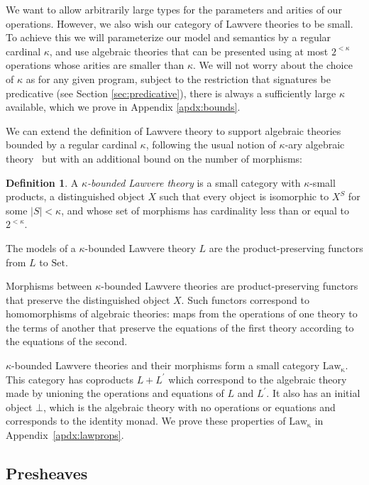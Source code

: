 \documentclass[acmsmall, screen, review, anonymous]{acmart}
\theoremstyle{definition}
\newtheorem{definition}{Definition}[section]
\newcommand{\setc}{\mathrm{Set}}
\newcommand{\initial}{\bot}
\newcommand{\lawc}{\mathrm{Law_{\kappa}}}
\begin{document}
We want to allow arbitrarily large types for the parameters and arities
of our operations. However, we also wish our category of Lawvere
theories to be small. To achieve this we will parameterize our model and
semantics by a regular cardinal $\kappa$, and use algebraic theories
that can be presented using at most $2^{<\kappa}$ operations whose
arities are smaller than $\kappa$. We will not worry about the choice of
$\kappa$ as for any given program, subject to the restriction that
signatures be predicative (see Section \ref{sec:predicative}), there is
always a sufficiently large $\kappa$ available, which we prove in
Appendix \ref{apdx:bounds}.

We can extend the definition of Lawvere theory to support algebraic
theories bounded by a regular cardinal $\kappa$, following the usual
notion of $\kappa$-ary algebraic theory~\cite{adamek1994locally} but
with an additional bound on the number of morphisms:
\begin{definition}
  A \emph{$\kappa$-bounded Lawvere theory} is a small category with
  $\kappa$-small products, a distinguished object $X$ such that every
  object is isomorphic to $X^S$ for some $|S| < \kappa$, and whose set
  of morphisms has cardinality less than or equal to $2^{<\kappa}$.
\end{definition}
The models of a $\kappa$-bounded Lawvere theory $L$ are the
product-preserving functors from $L$ to $\setc$.

Morphisms between $\kappa$-bounded Lawvere theories are
product-preserving functors that preserve the distinguished object
$X$. Such functors correspond to homomorphisms of algebraic theories:
maps from the operations of one theory to the terms of another that
preserve the equations of the first theory according to the equations of
the second.

$\kappa$-bounded Lawvere theories and their morphisms form a small
category $\lawc$. This category has coproducts $L + L^{\prime}$ which
correspond to the algebraic theory made by unioning the operations and
equations of $L$ and $L^{\prime}$. It also has an initial object
$\initial$, which is the algebraic theory with no operations or
equations and corresponds to the identity monad. We prove these
properties of $\lawc$ in Appendix~\ref{apdx:lawprops}.

\subsection{Presheaves}
\label{sec:presheaves}
\end{document}
